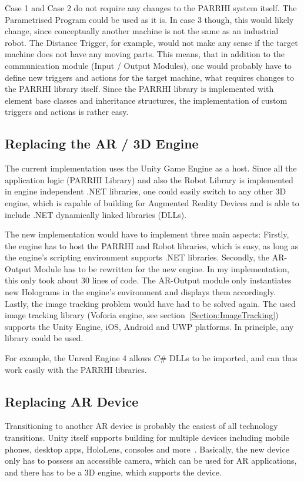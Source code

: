 Case 1 and Case 2 do not require any changes to the PARRHI system itself. The Parametrised Program could be used as it is. In case 3 though, this would likely change, since conceptually another machine is not the same as an industrial robot. The Distance Trigger, for example, would not make any sense if the target machine does not have any moving parts. This means, that in addition to the communication module (Input / Output Modules), one would probably have to define new triggers and actions for the target machine, what requires changes to the PARRHI library itself. Since the PARRHI library is implemented with element base classes and inheritance structures, the implementation of custom triggers and actions is rather easy.

\subsection{Replacing the AR / 3D Engine}

The current implementation uses the Unity Game Engine as a host. Since all the application logic (PARRHI Library) and also the Robot Library is implemented in engine independent .NET libraries, one could easily switch to any other 3D engine, which is capable of building for Augmented Reality Devices and is able to include .NET dynamically linked libraries (DLLs). 

The new implementation would have to implement three main aspects: Firstly, the engine has to host the PARRHI and Robot libraries, which is easy, as long as the engine's scripting environment supports .NET libraries. Secondly, the AR-Output Module has to be rewritten for the new engine. In my implementation, this only took about 30 lines of code. The AR-Output module only instantiates new Holograms in the engine's environment and displays them accordingly. Lastly, the image tracking problem would have had to be solved again. The used image tracking library (Voforia engine, see section~\ref{Section:ImageTracking}) supports the Unity Engine, iOS, Android and UWP platforms. In principle, any library could be used.

For example, the Unreal Engine 4 \cite{unrealEngine} allows $C\#$ DLLs to be imported, and can thus work easily with the PARRHI libraries.

\subsection{Replacing AR Device}

Transitioning to another AR device is probably the easiest of all technology transitions. Unity itself supports building for multiple devices including mobile phones, desktop apps, HoloLens, consoles and more~\cite{UnityPlatforms}. Basically, the new device only has to possess an accessible camera, which can be used for AR applications, and there has to be a 3D engine, which supports the device. 